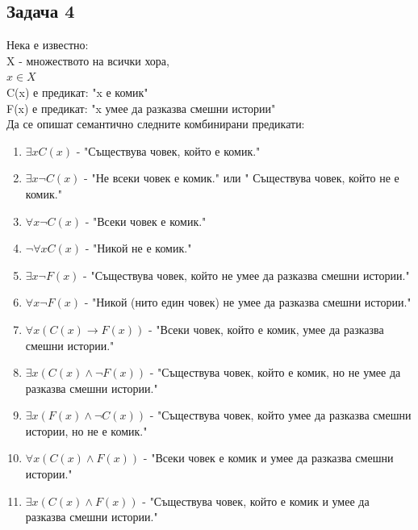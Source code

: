 \documentclass[fleqn, 12pt]{article}
\theoremstyle{definition}
\begin{document}
\subsection*{Задача 4}
Нека е известно: \\
X -  множеството на всички хора, \\
$x \in X$\\
C(x) е предикат: "x е комик" \\
F(x) е предикат:  "x умее да разказва смешни истории" \\
Да се опишат семантично следните комбинирани предикати:
\begin{enumerate}
\item $\exists x C(x)$ - "Съществува човек, който е комик."
\item $\exists x \neg C(x)$ - "Не всеки човек е комик." или " Съществува човек, който не е комик."
\item $\forall x \neg C(x)$ - "Всеки човек е комик."
\item $\neg \forall x C(x)$ - "Никой не е комик."
\item $\exists x \neg F(x)$ - "Съществува човек, който не умее да разказва смешни истории."
\item $\forall x \neg F(x)$ - "Никой (нито един човек) не умее да разказва смешни истории."
\item $\forall x (C(x) \to F(x))$ - "Всеки  човек, който  е  комик, умее  да  разказва  смешни истории."
\item $\exists x (C(x) \land \neg F(x))$ - "Съществува човек, който е комик, но не умее да разказва смешни истории."
\item $\exists x (F(x) \land \neg C(x))$ - "Съществува човек, който умее да разказва смешни истории, но не е комик."
\item $\forall x (C(x) \land F(x))$ - "Всеки човек е комик и умее да разказва смешни истории."
\item $\exists x (C(x) \land F(x))$ - "Съществува човек, който е комик и умее да разказва смешни истории."
\end{enumerate}
\end{document}
